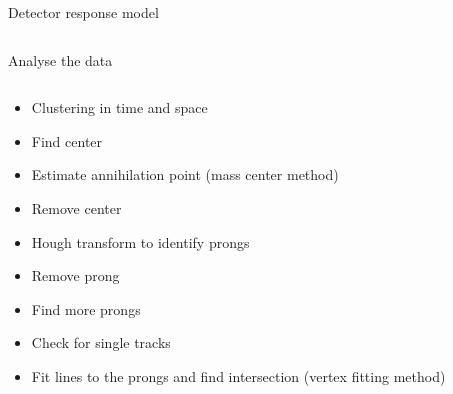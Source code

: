 \documentclass{beamer}
\begin{document}
\begin{frame}{\centering Detector response model}
\begin{columns}
\begin{column}{0.55\textwidth}
    \end{column}
    \end{columns}
\end{frame}



\begin{frame}{\centering Analyse the data}
  \begin{columns}
    \begin{column}{0.5\textwidth}
      \begin{itemize}
      \item<1->{Clustering in time and space}
      \item<2->{Find center}
      \item<3->{Estimate annihilation point (mass center method)}
      \item<4->{Remove center}
      \item<5->{Hough transform to identify prongs}
      \item<6->{Remove prong}
      \item<7->{Find more prongs}
      \item<8->{Check for single tracks}
      \item<11>{Fit lines to the prongs and find intersection (vertex fitting method)}
      \end{itemize}
    \end{column}
    \begin{column}{0.55\textwidth}
\end{column}
\end{columns}
\end{frame}
\end{document}
